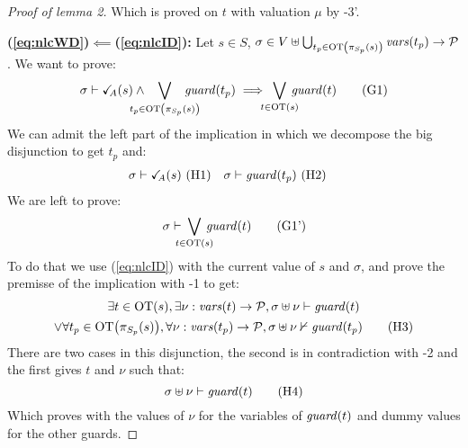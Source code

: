 \documentclass{article}
\begin{document}
\begin{proof}[Proof of lemma 2]
	Which is proved on \(t\) with valuation \(\mu\) by \hyp{3'}.
\item[\bf(\ref{eq:nlcWD})\(\impliedby\)(\ref{eq:nlcID}):]
	Let \(s \in S\), \(\sigma \in V \uplus \bigcup_{t_p \in \mathrm{OT}{\left(\pi_{S_p}{\left(s\right)}\right)}} \mathit{vars}{\left(t_p\right)} \to \mathcal{P}\).
	We want to prove:
	\[ \sigma \vdash \reach{A}\mpar{s} \wedge \bigvee_\subbox{t_p \in \fOT{\pi_{S_p}\mpar{s}}} \fguard{t_p} \implies \bigvee_\subbox{t \in \fOT{s}} \fguard{t} \goal{1} \]
	We can admit the left part of the implication in which we decompose the big disjunction to get \(t_p\) and:
	\begin{align*}
		\sigma \vdash \reach{A}\mpar{s} & \text{ \hyp{1}} &
		\sigma \vdash \fguard{t_p} & \text{ \hyp{2}}
	\end{align*}
	We are left to prove:
	\[ \sigma \vdash \bigvee_\subbox{t \in \fOT{s}} \fguard{t} \goal{1'} \]
	To do that we use (\ref{eq:nlcID}) with the current value of \(s\) and \(\sigma\), and prove the premisse of the implication with \hyp{1} to get:
	\begin{multline}
		\exists t \in \fOT{s}, \exists \nu: \fvars{t} \to \values, \sigma \uplus \nu \vdash \fguard{t} \\
		\vee \forall t_p \in \fOT{\pi_{S_p}\mpar{s}}, \forall \nu: \fvars{t_p} \to \values, \sigma \uplus \nu \nvdash \fguard{t_p} \hyp{3}
	\end{multline}
	There are two cases in this disjunction, the second is in contradiction with \hyp{2} and the first gives \(t\) and \(\nu\) such that:
	\[ \sigma \uplus \nu \vdash \fguard{t} \hyp{4} \]
	Which proves  with the values of \(\nu\) for the variables of \(\mathit{guard}{\left(t\right)}\) and dummy values for the other guards.
\end{proof}
\end{document}
